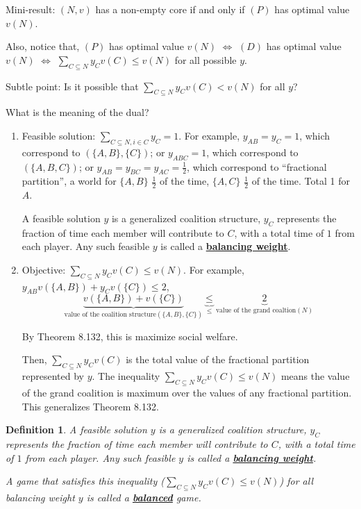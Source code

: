 \documentclass[twoside]{article}
\newtheorem{protodefinition}[prototheorem]{Definition}
\newenvironment{definition}
{\colorlet{shadecolor}{cyan!15}\begin{shaded}\begin{protodefinition}\normalfont}
		{\end{protodefinition}\end{shaded}}
\begin{document}
Mini-result: $(N, v)$ has a non-empty core if and only if $(P)$ has optimal value $v(N)$. 

Also, notice that, $(P)$ has optimal value $v(N)$ $\Leftrightarrow$ $(D)$ has optimal value $v(N)$ $\Leftrightarrow$ $\sum_{C \subseteq N} y_Cv(C) \leq v(N)$ for all possible $y$. 

Subtle point: Is it possible that $\sum_{C \subseteq N} y_Cv(C) < v(N)$ for all $y$? 

What is the meaning of the dual? \begin{enumerate}
\item Feasible solution: $\sum_{C \subseteq N, i \in C} y_C = 1$. For example, $y_{AB} = y_C = 1$, which correspond to $(\{A, B\}, \{C\})$; or $y_{ABC} = 1$, which correspond to $(\{A, B, C\})$; or $y_{AB} = y_{BC} = y_{AC} = \frac{1}{2}$, which correspond to ``fractional partition'', a world for $\{A, B\}$ $\frac{1}{2}$ of the time, $\{A, C\}$ $\frac{1}{2}$ of the time. Total 1 for $A$. 
	
A feasible solution $y$ is a generalized coalition structure, $y_C$ represents the fraction of time each member will contribute to $C$, with a total time of $1$ from each player. Any such feasible $y$ is called a \textbf{\underline{balancing weight}}.
	
\item Objective: $\sum_{C \subseteq N} y_Cv(C) \leq v(N)$. For example, $y_{AB}v(\{A, B\}) + y_Cv(\{C\}) \leq 2$, $$\underbrace{v(\{A, B\}) + v(\{C\})}_{\text{value of the coalition structure} (\{A, B\}, \{C\})} \underbrace{\leq}_\leq \underbrace{2}_{\text{value of the grand coaltion} (N)}$$
	
By Theorem 8.132, this is maximize social welfare. 
	
Then, $\sum_{C \subseteq N} y_Cv(C)$ is the total value of the fractional partition represented by $y$. The inequality $\sum_{C \subseteq N} y_Cv(C) \leq v(N)$ means the value of the grand coalition is maximum over the values of any fractional partition. This generalizes Theorem 8.132. 
\end{enumerate}

\begin{definition}
	A feasible solution $y$ is a generalized coalition structure, $y_C$ represents the fraction of time each member will contribute to $C$, with a total time of $1$ from each player. Any such feasible $y$ is called a \textbf{\underline{balancing weight}}.
		
	A game that satisfies this inequality ($\sum_{C \subseteq N} y_Cv(C) \leq v(N)$) for all balancing weight $y$ is called a \textbf{\underline{balanced}} game. 
\end{definition}
\end{document}

